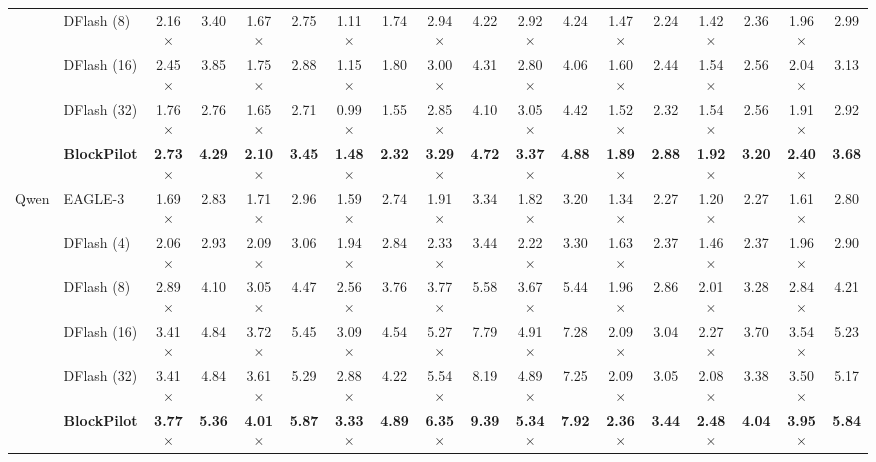 \documentclass{article}
\begin{document}
\begin{table}[ht]
{\begin{tabular}{@{}ll*{8}{cc}@{}}
& DFlash (8)  & 2.16$\times$ & 3.40 & 1.67$\times$ & 2.75 & 1.11$\times$ & 1.74 & 2.94$\times$ & 4.22 & 2.92$\times$ & 4.24 & 1.47$\times$ & 2.24 & 1.42$\times$ & 2.36 & 1.96$\times$ & 2.99 \\
& DFlash (16) & 2.45$\times$ & 3.85 & 1.75$\times$ & 2.88 & 1.15$\times$ & 1.80 & 3.00$\times$ & 4.31 & 2.80$\times$ & 4.06 & 1.60$\times$ & 2.44 & 1.54$\times$ & 2.56 & 2.04$\times$ & 3.13 \\
& DFlash (32) & 1.76$\times$ & 2.76 & 1.65$\times$ & 2.71 & 0.99$\times$ & 1.55 & 2.85$\times$ & 4.10 & 3.05$\times$ & 4.42 & 1.52$\times$ & 2.32 & 1.54$\times$ & 2.56 & 1.91$\times$ & 2.92 \\
& \textbf{BlockPilot} & \textbf{2.73$\times$} & \textbf{4.29} & \textbf{2.10$\times$} & \textbf{3.45} & \textbf{1.48$\times$} & \textbf{2.32} & \textbf{3.29$\times$} & \textbf{4.72} & \textbf{3.37$\times$} & \textbf{4.88} & \textbf{1.89$\times$} & \textbf{2.88} & \textbf{1.92$\times$} & \textbf{3.20} & \textbf{2.40$\times$} & \textbf{3.68} \\
\midrule
\multirow{6}{*}{Qwen}
& EAGLE-3     & 1.69$\times$ & 2.83 & 1.71$\times$ & 2.96 & 1.59$\times$ & 2.74 & 1.91$\times$ & 3.34 & 1.82$\times$ & 3.20 & 1.34$\times$ & 2.27 & 1.20$\times$ & 2.27 & 1.61$\times$ & 2.80 \\
& DFlash (4)  & 2.06$\times$ & 2.93 & 2.09$\times$ & 3.06 & 1.94$\times$ & 2.84 & 2.33$\times$ & 3.44 & 2.22$\times$ & 3.30 & 1.63$\times$ & 2.37 & 1.46$\times$ & 2.37 & 1.96$\times$ & 2.90 \\
& DFlash (8)  & 2.89$\times$ & 4.10 & 3.05$\times$ & 4.47 & 2.56$\times$ & 3.76 & 3.77$\times$ & 5.58 & 3.67$\times$ & 5.44 & 1.96$\times$ & 2.86 & 2.01$\times$ & 3.28 & 2.84$\times$ & 4.21 \\
& DFlash (16) & 3.41$\times$ & 4.84 & 3.72$\times$ & 5.45 & 3.09$\times$ & 4.54 & 5.27$\times$ & 7.79 & 4.91$\times$ & 7.28 & 2.09$\times$ & 3.04 & 2.27$\times$ & 3.70 & 3.54$\times$ & 5.23 \\
& DFlash (32) & 3.41$\times$ & 4.84 & 3.61$\times$ & 5.29 & 2.88$\times$ & 4.22 & 5.54$\times$ & 8.19 & 4.89$\times$ & 7.25 & 2.09$\times$ & 3.05 & 2.08$\times$ & 3.38 & 3.50$\times$ & 5.17 \\
& \textbf{BlockPilot} & \textbf{3.77$\times$} & \textbf{5.36} & \textbf{4.01$\times$} & \textbf{5.87} & \textbf{3.33$\times$} & \textbf{4.89} & \textbf{6.35$\times$} & \textbf{9.39} & \textbf{5.34$\times$} & \textbf{7.92} & \textbf{2.36$\times$} & \textbf{3.44} & \textbf{2.48$\times$} & \textbf{4.04} & \textbf{3.95$\times$} & \textbf{5.84} \\
\bottomrule
\end{tabular}%
}
\end{table}
\end{document}
